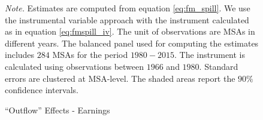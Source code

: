 \documentclass[dv_diss_main.tex]{subfiles}
\begin{document}
\begin{figure}[ht]
\begin{center}
\begin{tabular}[c]{ccc}
    \end{tabular}
    \end{center}
    
    
    \caption{``Outflow'' Effects - Earnings}
    \footnotesize{\textit{Note. } Estimates are computed from  equation \eqref{eq:fm_spill}. We use the instrumental variable approach with the instrument calculated as in equation \eqref{eq:fmspill_iv}. The unit of observations are MSAs in different years. The balanced panel used for computing the estimates includes $284$ MSAs for the period $1980-2015$. The instrument is calculated using observations between $1966$ and $1980$. Standard errors are clustered at MSA-level. The shaded areas report the $90\%$ confidence intervals.}
    \label{fig:earn_spill}
\end{figure}
\newpage
\end{document}
